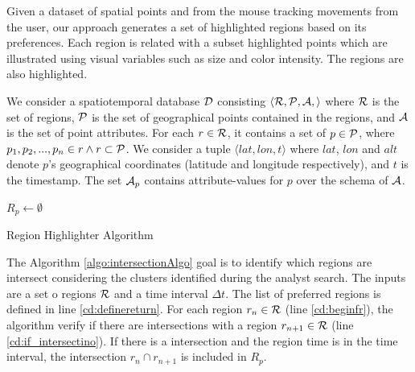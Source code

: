 \documentclass[runningheads,a4paper]{llncs}
\begin{document}
Given a dataset of spatial points and from the mouse tracking movements from the user, our approach generates a set of highlighted regions based on its preferences. Each region is related with a subset highlighted points which are illustrated using visual variables such as size and color intensity. The regions are also highlighted.

 We consider a spatiotemporal database ${\cal D}$ consisting $\langle {\cal R},  {\cal P}, {\cal A},  \rangle$ where ${\cal R}$ is the set of regions, ${\cal P}$ is the set of
geographical points contained in the regions, and ${\cal A}$ is the set of point attributes.  For each $r \in {\cal R}$,  it contains a set of $p \in {\cal P}$, where $p_1,p_2,...,p_n  \in r \land  r \subset	{\cal P}$. We consider a tuple $\langle lat, lon, t\rangle$ where $lat$, $lon$ and $alt$ denote $p$'s geographical coordinates (latitude and longitude  respectively), and $t$ is the timestamp. The set ${\cal A}_p$ contains attribute-values for $p$ over the schema of ${\cal A}$. 

\begin{algorithm}[t]
	\DontPrintSemicolon
	${ R_p} \gets \emptyset$\;\label{cd:definereturn}
	\; 
	\caption{{\sc Region Highlighter} Algorithm}
	\label{algo:intersectionAlgo}
\end{algorithm}

The Algorithm \ref{algo:intersectionAlgo} goal is to identify which regions are intersect considering the clusters identified during  the analyst search. The inputs are a set o regions ${\cal R}$  and a time interval $\Delta t$. The list of preferred regions is defined in line \ref{cd:definereturn}. For each region $r_n \in {\cal R}$ (line \ref{cd:beginfr}), the algorithm verify if there are intersections with  a region $r_{n+1} \in {\cal R}$ (line \ref{cd:if_intersectino}). If there is a intersection and the region time is in the time interval, the intersection $r_n \cap r_{n+1} $ is included in ${ R_p}$.
\end{document}
